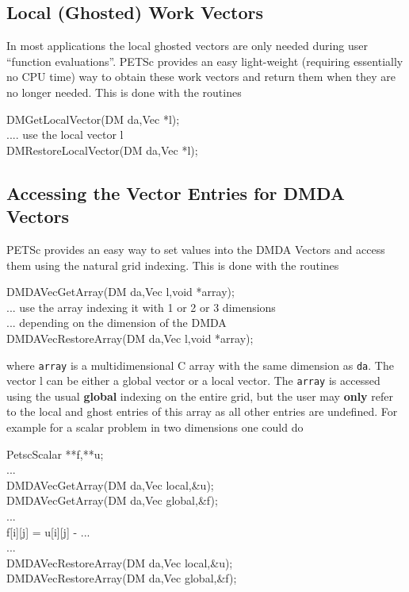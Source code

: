 \subsection{Local (Ghosted) Work Vectors}
In most applications the local ghosted vectors are only needed during user
``function evaluations''. PETSc provides an easy light-weight (requiring
essentially no CPU time) way to obtain these work vectors and return them when
they are no longer needed. This is done with the routines
\begin{tabbing}
  DMGetLocalVector(DM da,Vec *l);\\
   .... use the local vector l\\
  DMRestoreLocalVector(DM da,Vec *l);
\end{tabbing}

\subsection{Accessing the Vector Entries for DMDA Vectors}
PETSc provides an easy way to set values into the DMDA Vectors and access them using
the natural grid indexing. This is done with the routines
\begin{tabbing}
  DMDAVecGetArray(DM da,Vec l,void *array);\\
   ... use the array indexing it with 1 or 2 or 3 dimensions \\
   ... depending on the dimension of the DMDA\\
  DMDAVecRestoreArray(DM da,Vec l,void *array);
\end{tabbing}
where {\tt array} is a multidimensional C array with the same dimension as
{\tt da}. The vector l can be either a global vector or a local vector.
The {\tt array} is accessed using the usual {\bf global} indexing
on the entire grid, but the user may {\bf only} refer to the local and ghost
entries of this array as all other entries are undefined. For example for a
scalar problem in two dimensions one could do
\begin{tabbing}
   PetscScalar **f,**u;\\
   ...\\
  DMDAVecGetArray(DM da,Vec local,\&u);\\
  DMDAVecGetArray(DM da,Vec global,\&f);\\
   ...\\
      f[i][j] = u[i][j] - ...\\
   ...\\
  DMDAVecRestoreArray(DM da,Vec local,\&u);\\
  DMDAVecRestoreArray(DM da,Vec global,\&f);
\end{tabbing}

